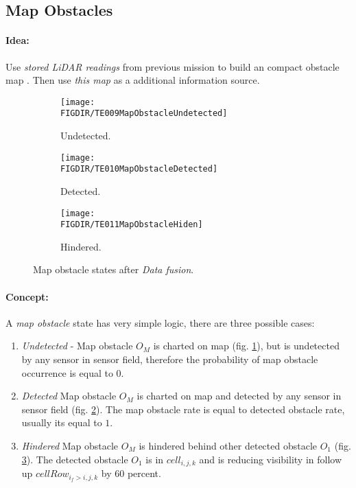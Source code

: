 \subsection{Map Obstacles}\label{s:mapObstacles}
\paragraph{Idea:} Use \emph{stored LiDAR readings} from previous mission to build an compact obstacle map \cite{cernamaria2018}. Then use \emph{this map} as a additional information source.

\begin{figure}[H]
    \begin{subfigure}{0.32\textwidth}
        \texttt{[image: \\FIGDIR/TE009MapObstacleUndetected]} 
        \caption{Undetected.}
        \label{fig:undetectedMapObstalce}
    \end{subfigure}
    \begin{subfigure}{0.32\textwidth}
        \texttt{[image: \\FIGDIR/TE010MapObstacleDetected]} 
        \caption{Detected.}
        \label{fig:detectedMapObstacle}
    \end{subfigure}
    \begin{subfigure}{0.32\textwidth}
        \texttt{[image: \\FIGDIR/TE011MapObstacleHiden]}
        \caption{Hindered.}
        \label{fig:hinderedMapObstacle}
    \end{subfigure}
    \caption{Map obstacle states after \emph{Data fusion}.}
    \label{fig:mapObstacleStatesAfterDataFusion}
\end{figure}

\paragraph{Concept:} A \emph{map obstacle} state has very simple logic, there are three possible cases:

\begin{enumerate}
    \item \emph{Undetected} - Map obstacle $O_M$ is charted on map (fig. \ref{fig:undetectedMapObstalce}), but is undetected by any sensor in sensor field, therefore the probability of map obstacle occurrence is equal to $0$.


    \item \emph{Detected} Map obstacle $O_M$ is charted on map and detected by any sensor in sensor field (fig. \ref{fig:detectedMapObstacle}). The map obstacle rate is equal to detected obstacle rate, usually its equal to $1$.

    \item \emph{Hindered} Map obstacle $O_M$ is hindered behind other detected obstacle $O_1$ (fig. \ref{fig:hinderedMapObstacle}). The detected obstacle $O_1$ is in $cell_{i,j,k}$ and is reducing visibility in follow up $cellRow_{i_f>i,j,k}$ by $60$ percent.
\end{enumerate}

